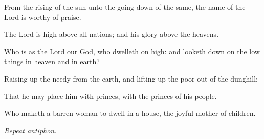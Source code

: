 \documentclass[letterpaper,12pt]{article} %
\begin{document}
\begin{parcolumns}[rulebetween,colwidths={1=290pt}]{2}
{\begin{psalmverses}[0]
\item From the rising of the sun unto the going down of the same, the name of the Lord is worthy of praise.
\item The Lord is high above all nations; and his glory above the heavens.
\item Who is as the Lord our God, who dwelleth on high: and looketh down on the low things in heaven and in earth?
\item Raising up the needy from the earth, and lifting up the poor out of the dunghill:
\item That he may place him with princes, with the princes of his people.
\item Who maketh a barren woman to dwell in a house, the joyful mother of children.
\end{psalmverses}
}
\end{parcolumns}

\smallskip
{\noindent\emph{Repeat antiphon.}\\}

\medskip
\pagebreak
\medskip
\end{document}
